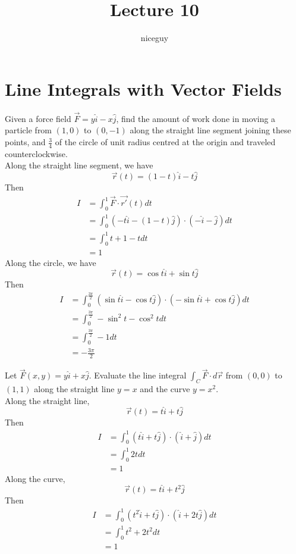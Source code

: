 \documentclass[12pt]{article}
\title{Lecture 10}
\author{niceguy}
\begin{document}
\maketitle

\section{Line Integrals with Vector Fields}

\begin{ex}
	Given a force field $\vec{F} = y\hat{i} -x\hat{j}$, find the amount of work done in moving a particle from $(1,0)$ to $(0,-1)$ along the straight line segment joining these points, and $\frac{3}{4}$ of the circle of unit radius centred at the origin and traveled counterclockwise. \\
	Along the straight line segment, we have
	$$\vec{r}(t) = (1-t)\hat{i} - t\hat{j}$$
	Then
	\begin{align*}
		I &= \int_0^1 \vec{F} \cdot \vec{r'}(t) dt \\
		  &= \int_0^1 (-t\hat{i}-(1-t)\hat{j})\cdot(-\hat{i}-\hat{j}) dt \\
		  &= \int_0^1 t + 1 - t dt \\
		  &= 1
	\end{align*}
	Along the circle, we have
	$$\vec{r}(t) = \cos t\hat{i} + \sin t\hat{j}$$
	Then
	\begin{align*}
		I &= \int_0^{\frac{3\pi}{2}} (\sin t\hat{i} - \cos t\hat{j}) \cdot (-\sin t\hat{i} + \cos t\hat{j}) dt \\
		  &= \int_0^{\frac{3\pi}{2}} -\sin^2t - \cos^2t dt \\
		  &= \int_0^{\frac{3\pi}{2}} -1 dt \\
		  &= -\frac{3\pi}{2}
	\end{align*}
\end{ex}

\begin{ex}
	Let $\vec{F}(x,y) = y\hat{i} + x\hat{j}$. Evaluate the line integral $\int_C \vec{F}\cdot d\vec{r}$ from $(0,0)$ to $(1,1)$ along the straight line $y=x$ and the curve $y=x^2$. \\
	Along the straight line,
	$$\vec{r}(t) = t\hat{i} + t\hat{j}$$
	Then
	\begin{align*}
		I &= \int_0^1 (t\hat{i} + t\hat{j}) \cdot (\hat{i} + \hat{j}) dt \\
		  &= \int_0^1 2tdt \\
		  &= 1
	\end{align*}
	Along the curve,
	$$\vec{r}(t) = t\hat{i} + t^2\hat{j}$$
	Then
	\begin{align*}
		I &= \int_0^1 (t^2\hat{i} + t\hat{j}) \cdot (\hat{i} + 2t\hat{j}) dt \\
		  &= \int_0^1 t^2 + 2t^2 dt \\
		  &= 1
	\end{align*}
\end{ex}
\end{document}
